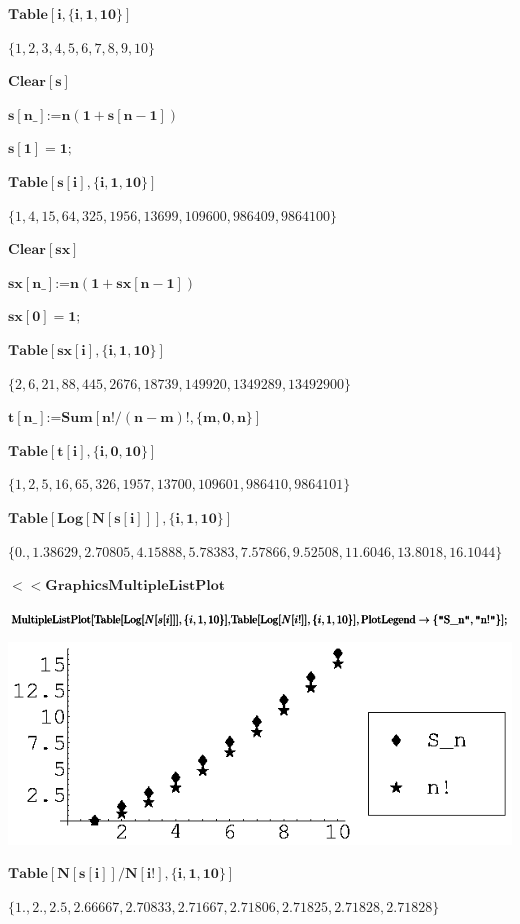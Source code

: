 \documentclass{article}
\begin{document}
\noindent\(\pmb{\text{Table}[i,\{i,1,10\}]}\)

\noindent\(\{1,2,3,4,5,6,7,8,9,10\}\)

\noindent\(\pmb{\text{Clear}[s]}\)

\noindent\(\pmb{s[\text{n$\_$}]\text{:=}n(1+s[n-1])}\)

\noindent\(\pmb{s[1]=1;}\)

\noindent\(\pmb{\text{Table}[s[i],\{i,1,10\}]}\)

\noindent\(\{1,4,15,64,325,1956,13699,109600,986409,9864100\}\)

\noindent\(\pmb{\text{Clear}[\text{sx}]}\)

\noindent\(\pmb{\text{sx}[\text{n$\_$}]\text{:=}n(1+\text{sx}[n-1])}\)

\noindent\(\pmb{\text{sx}[0]=1;}\)

\noindent\(\pmb{\text{Table}[\text{sx}[i],\{i,1,10\}]}\)

\noindent\(\{2,6,21,88,445,2676,18739,149920,1349289,13492900\}\)

\noindent\(\pmb{t[\text{n$\_$}]\text{:=}\text{Sum}[n!/(n-m)!,\{m,0,n\}]}\)

\noindent\(\pmb{\text{Table}[t[i],\{i,0,10\}]}\)

\noindent\(\{1,2,5,16,65,326,1957,13700,109601,986410,9864101\}\)

\noindent\(\pmb{\text{Table}[\text{Log}[N[s[i]]],\{i,1,10\}]}\)

\noindent\(\{0.,1.38629,2.70805,4.15888,5.78383,7.57866,9.52508,11.6046,13.8018,16.1044\}\)

\noindent\(\pmb{<<\text{Graphics$\grave{ }$MultipleListPlot$\grave{ }$}}\)

\noindent\(\pmb{\text{MultipleListPlot}[\text{Table}[\text{Log}[N[s[i]]],\{i,1,10\}],}\\
\pmb{\text{Table}[\text{Log}[N[i!]],\{i,1,10\}],\text{PlotLegend}\to \{\text{$\texttt{"}$S$\_$n$\texttt{"}$},\text{$\texttt{"}$n!$\texttt{"}$}\}];}\)

\includegraphics{Perms_gr1.eps}

\noindent\(\pmb{\text{Table}[N[s[i]]/N[i!],\{i,1,10\}]}\)

\noindent\(\{1.,2.,2.5,2.66667,2.70833,2.71667,2.71806,2.71825,2.71828,2.71828\}\)
\end{document}
